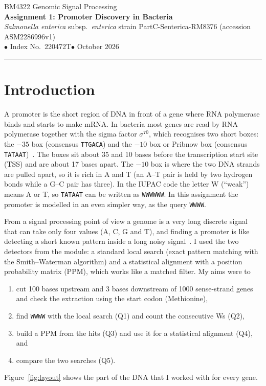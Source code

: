 \documentclass[11pt,a4paper]{article}
\newcommand{\studentname}{}          %
\newcommand{\indexno}{220472T}
\newcommand{\seqs}[1]{\texttt{#1}}
\begin{document}
\begin{center}
  {\large BM4322 Genomic Signal Processing}\\[4pt]
  {\LARGE\bfseries Assignment 1: Promoter Discovery in Bacteria}\\[8pt]
  \textit{Salmonella enterica} subsp.\ \textit{enterica} strain PartC-Senterica-RM8376
  \quad(accession ASM2286996v1)\\[6pt]
  \if\relax\detokenize\expandafter{\studentname}\relax\else\studentname\quad$\bullet$\quad\fi
  Index No.\ \indexno\quad$\bullet$ October 2026
\end{center}
\vspace{4pt}\hrule\vspace{8pt}

\section{Introduction}
A promoter is the short region of DNA in front of a gene where RNA polymerase binds and starts to
make mRNA. In bacteria most genes are read by RNA polymerase together with the sigma factor
$\sigma^{70}$, which recognises two short boxes: the $-35$ box (consensus \seqs{TTGACA}) and the
$-10$ box or Pribnow box (consensus \seqs{TATAAT})~\cite{pribnow,harley}. The boxes sit about 35 and
10 bases before the transcription start site (TSS) and are about 17 bases apart. The $-10$ box is
where the two DNA strands are pulled apart, so it is rich in A and T (an A--T pair is held by two
hydrogen bonds while a G--C pair has three). In the IUPAC code the letter W (``weak'') means A or T,
so \seqs{TATAAT} can be written as \seqs{WWWWWW}. In this assignment the promoter is modelled in an
even simpler way, as the query \seqs{WWWW}.

From a signal processing point of view a genome is a very long discrete signal that can take only
four values (A, C, G and T), and finding a promoter is like detecting a short known pattern inside a
long noisy signal~\cite{anastassiou}. I used the two detectors from the module: a standard local
search (exact pattern matching with the Smith--Waterman algorithm) and a statistical alignment with a
position probability matrix (PPM), which works like a matched filter. My aims were to
\begin{enumerate}
  \item cut 100 bases upstream and 3 bases downstream of 1000 sense-strand genes and check the
        extraction using the start codon (Methionine),
  \item find \seqs{WWWW} with the local search (Q1) and count the consecutive Ws (Q2),
  \item build a PPM from the hits (Q3) and use it for a statistical alignment (Q4), and
  \item compare the two searches (Q5).
\end{enumerate}
Figure~\ref{fig:layout} shows the part of the DNA that I worked with for every gene.
\end{document}
